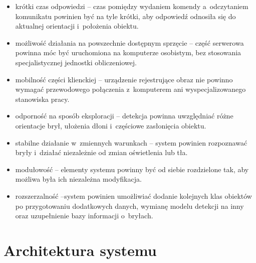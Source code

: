 \begin{itemize}
    \item krótki czas odpowiedzi -- czas pomiędzy wydaniem komendy a~odczytaniem komunikatu powinien być na tyle krótki, aby odpowiedź odnosiła się do aktualnej orientacji i~położenia obiektu.
    \item możliwość działania na powszechnie dostępnym sprzęcie -- część serwerowa powinna móc być uruchomiona na komputerze osobistym, bez stosowania specjalistycznej jednostki obliczeniowej.
    \item mobilność części klienckiej -- urządzenie rejestrujące obraz nie powinno wymagać przewodowego połączenia z~komputerem ani wyspecjalizowanego stanowiska pracy.
    \item odporność na sposób eksploracji -- detekcja powinna uwzględniać różne orientacje brył, ułożenia dłoni i~częściowe zasłonięcia obiektu.
    \item stabilne działanie w~zmiennych warunkach -- system powinien rozpoznawać bryły i~działać niezależnie od zmian oświetlenia lub tła.
    \item modułowość -- elementy systemu powinny być od siebie rozdzielone tak, aby możliwa była ich niezależna modyfikacja.
    \item rozszerzalność --system powinien umożliwiać dodanie kolejnych klas obiektów po przygotowaniu dodatkowych danych, wymianę modelu detekcji na inny oraz uzupełnienie bazy informacji o~bryłach.
\end{itemize}

\section{Architektura systemu}
\label{sec:architektura}



